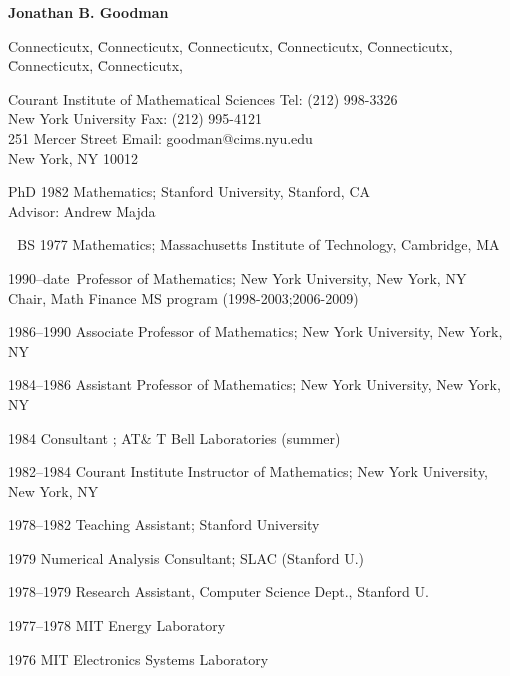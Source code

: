 \documentclass[10pt]{article}
\newcommand{\name}{\par\centerline{\large\bf{
Jonathan B. Goodman}}\vspace{.25\baselineskip} \par}
\newcommand{\heading}[1]{\par\noindent{\normalsize\bf{#1}}\par}
\newenvironment{items}[4]%
{\begin{minipage}[t]{#1}
 \begin{list}{ }{ \setlength{\leftmargin}{#2}
                 \setlength{\labelwidth}{#3}
                 \setlength{\labelsep}{#4}
                 \setlength{\parsep}{0in}
                 \setlength{\topsep}{0in}
                 \setlength{\partopsep}{0in}
                 \setlength{\itemsep}{0pt}
                 \setlength{\rightmargin}{0in} } }%
{\end{list}
 \end{minipage}}
\begin{document}
\pagestyle{empty}
\newlength{\noyear}
\settowidth{\noyear}{1984}
\newlength{\nyd}
\settowidth{\nyd}{--1984}
\newlength{\boxw}
\setlength{\boxw}{0.99\textwidth}
\newlength{\boxp}
\setlength{\boxp}{0.9\textwidth}

\name
\vspace{.2in}
\vspace*{-.15in}
\begin{tabbing}
Connecticutx, \=Connecticutx, \=Connecticutx, \=Connecticutx,
\=Connecticutx, \=Connecticutx, \=Connecticutx, \kill

Courant Institute of Mathematical Sciences  \>\>\>\> Tel: (212) 998-3326 \\
New York University  \>\>\>\>  Fax: (212) 995-4121 \\
251 Mercer Street \>\>\>\> Email: goodman@cims.nyu.edu \\
New York, NY 10012 \\
\end{tabbing}

\vspace*{.1in}
\vspace*{.0in}

\heading{Education}
\vspace*{-.1in}
\begin{items}{\boxw}{1.0in}{1.0in}{0.2in}
\item[PhD 1982] Mathematics; 
		{Stanford University}, Stanford, CA		\\
		Advisor:  Andrew Majda
\item[\,\,\,\,BS 1977]  Mathematics;
		{Massachusetts Institute of Technology}, Cambridge, MA	
\end{items}

\vfill
\heading{Positions}
\vspace*{-.1in}
\begin{items}{\boxw}{1.0in}{1.0in}{0.2in}
\item[1990--date\,] Professor of Mathematics;
		New York University,  New York, NY\\
		Chair, Math Finance MS program (1998-2003;2006-2009)

\item[1986--1990] Associate Professor of Mathematics; 
		New York University,  New York, NY	
\item[1984--1986] Assistant Professor of Mathematics; 
		New York University,  New York, NY	
\item[1984] Consultant ; AT\& T Bell Laboratories (summer)
\item[1982--1984] Courant Institute Instructor of Mathematics; 
		New York University,  New York, NY	\\
\item[1978--1982] Teaching Assistant; Stanford University
\item[1979] Numerical Analysis Consultant; SLAC (Stanford U.)
\item[1978--1979] Research Assistant, Computer Science Dept., Stanford U.
\item[1977--1978] MIT Energy Laboratory 
\item[1976] MIT Electronics Systems Laboratory 
\end{items}
\end{document}
